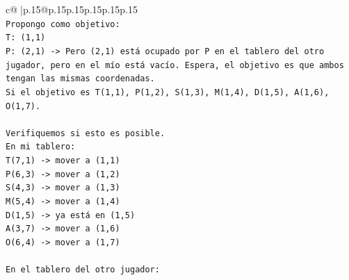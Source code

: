 \documentclass{article}
\begin{document}
{\begin{supertabular}{c@{$\;$}|p{.15\linewidth}@{}p{.15\linewidth}p{.15\linewidth}p{.15\linewidth}p{.15\linewidth}p{.15\linewidth}}
{{{\\ 
\texttt{Propongo como objetivo:} \\
\texttt{T: (1,1)} \\
\texttt{P: (2,1) {-}> Pero (2,1) está ocupado por P en el tablero del otro jugador, pero en el mío está vacío. Espera, el objetivo es que ambos tengan las mismas coordenadas.} \\
\texttt{Si el objetivo es T(1,1), P(1,2), S(1,3), M(1,4), D(1,5), A(1,6), O(1,7).} \\
\\ 
\texttt{Verifiquemos si esto es posible.} \\
\texttt{En mi tablero:} \\
\texttt{T(7,1) {-}> mover a (1,1)} \\
\texttt{P(6,3) {-}> mover a (1,2)} \\
\texttt{S(4,3) {-}> mover a (1,3)} \\
\texttt{M(5,4) {-}> mover a (1,4)} \\
\texttt{D(1,5) {-}> ya está en (1,5)} \\
\texttt{A(3,7) {-}> mover a (1,6)} \\
\texttt{O(6,4) {-}> mover a (1,7)} \\
\\ 
\texttt{En el tablero del otro jugador:} \\
            }
        }
    }
     \\ \\


\end{supertabular}}
\end{document}
